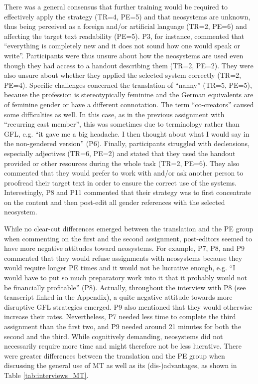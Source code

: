 There was a general consensus that further training would be required to effectively apply the strategy (TR=4, PE=5) and that neosystems are unknown, thus being perceived as a foreign and/or artificial language (TR=2, PE=6) and affecting the target text readability (PE=5). P3, for instance, commented that ``everything is completely new and it does not sound how one would speak or write''. Participants were thus unsure about how the neosystems are used even though they had access to a handout describing them (TR=2, PE=2). They were also unsure about whether they applied the selected system correctly (TR=2, PE=4). Specific challenges concerned the translation of ``nanny'' (TR=5, PE=5), because the profession is stereotypically feminine and the German equivalents are of feminine gender or have a different connotation. The term ``co-creators'' caused some difficulties as well. In this case, as in the previous assignment with ``recurring cast member'', this was sometimes due to terminology rather than GFL, e.g. ``it gave me a big headache. I then thought about what I would say in the non-gendered version'' (P6). Finally, participants struggled with declensions, especially adjectives (TR=6, PE=2) and stated that they used the handout provided or other resources during the whole task (TR=2, PE=6). They also commented that they would prefer to work with and/or ask another person to proofread their target text in order to ensure the correct use of the systems. Interestingly, P8 and P11 commented that their strategy was to first concentrate on the content and then post-edit all gender references with the selected neosystem.

While no clear-cut differences emerged between the translation and the PE group when commenting on the first and the second assignment, post-editors seemed to have more negative attitudes toward neosystems. For example, P7, P8, and P9 commented that they would refuse assignments with neosystems because they would require longer PE times and it would not be lucrative enough, e.g. ``I would have to put so much preparatory work into it that it probably would not be financially profitable'' (P8). Actually, throughout the interview with P8 (see transcript linked in the Appendix), a quite negative attitude towards more disruptive GFL strategies emerged. P9 also mentioned that they would otherwise increase their rates. Nevertheless, P7 needed less time to complete the third assignment than the first two, and P9 needed around 21 minutes for both the second and the third. While cognitively demanding, neosystems did not necessarily require more time and might therefore not be less lucrative. There were greater differences between the translation and the PE group when discussing the general use of MT as well as its (dis-)advantages, as shown in Table \ref{tab:interviews_MT}.

